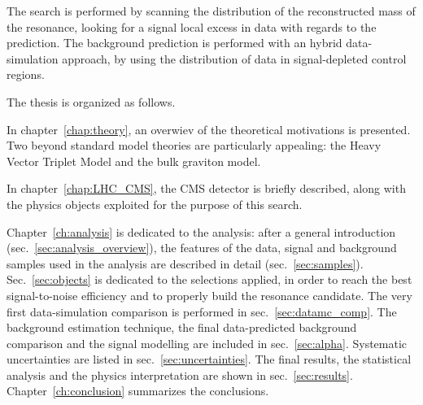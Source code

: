 \noindent The search is performed by scanning the distribution of the reconstructed mass of the resonance, looking for a signal local excess in data with regards to the prediction. The background prediction is performed with an hybrid data-simulation approach, by using the distribution of data in signal-depleted control regions.

\newpage

\noindent The thesis is organized as follows.

\noindent In chapter~\ref{chap:theory}, an overwiev of the theoretical motivations is presented. Two beyond standard model theories are particularly appealing: the Heavy Vector Triplet Model and the bulk graviton model.

\noindent In chapter~\ref{chap:LHC_CMS}, the CMS detector is briefly described, along with the physics objects exploited for the purpose of this search.

\noindent Chapter~\ref{ch:analysis} is dedicated to the analysis: after a general introduction (sec.~\ref{sec:analysis_overview}), the features of the data, signal and background samples used in the analysis are described in detail (sec.~\ref{sec:samples}). Sec.~\ref{sec:objects} is dedicated to the selections applied, in order to reach the best signal-to-noise efficiency and to properly build the resonance candidate. The very first data-simulation comparison is performed in sec.~\ref{sec:datamc_comp}. The background estimation technique, the final data-predicted background comparison and the signal modelling are included in sec.~\ref{sec:alpha}. Systematic uncertainties are listed in sec.~\ref{sec:uncertainties}. The final results, the statistical analysis and the physics interpretation are shown in sec.~\ref{sec:results}. Chapter~\ref{ch:conclusion} summarizes the conclusions.

\clearpage

